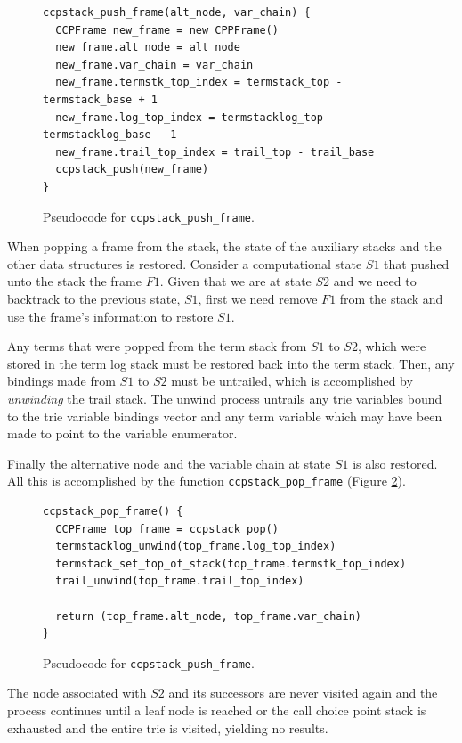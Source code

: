 \begin{figure}[ht]
\begin{Verbatim}[fontsize=\small]
ccpstack_push_frame(alt_node, var_chain) {
  CCPFrame new_frame = new CPPFrame()
  new_frame.alt_node = alt_node
  new_frame.var_chain = var_chain
  new_frame.termstk_top_index = termstack_top - termstack_base + 1
  new_frame.log_top_index = termstacklog_top - termstacklog_base - 1
  new_frame.trail_top_index = trail_top - trail_base
  ccpstack_push(new_frame)
}
\end{Verbatim}
\caption{Pseudo\-code for \texttt{ccpstack\_push\_frame}.}
\label{fig:ccpstack_push_frame}
\end{figure}

When popping a frame from the stack, the state of the auxiliary stacks and the other data
structures is restored. Consider a computational state $S1$ that pushed unto the stack
the frame $F1$. Given that we are at state $S2$ and we need to backtrack to the previous state, $S1$,
first we need remove $F1$ from the stack and use the frame's information to restore $S1$.

Any terms that were popped from the term stack from $S1$ to $S2$, which were
stored in the term log stack must be restored back into the term stack.
Then, any bindings made from $S1$ to $S2$ must be untrailed, which is
accomplished by \textit{unwinding} the trail stack. The unwind process untrails
any trie variables bound to the trie variable bindings vector
and any term variable which may have been made to point to the variable enumerator. 

Finally the alternative node and
the variable chain at state $S1$ is also restored. All this is accomplished by the
function \texttt{ccpstack\_pop\_frame} (Figure \ref{fig:ccpstack_pop_frame}).

\begin{figure}[ht]
\begin{Verbatim}[fontsize=\small]
ccpstack_pop_frame() {
  CCPFrame top_frame = ccpstack_pop()
  termstacklog_unwind(top_frame.log_top_index)
  termstack_set_top_of_stack(top_frame.termstk_top_index)
  trail_unwind(top_frame.trail_top_index)
  
  return (top_frame.alt_node, top_frame.var_chain)
}
\end{Verbatim}
\caption{Pseudo\-code for \texttt{ccpstack\_push\_frame}.}
\label{fig:ccpstack_pop_frame}
\end{figure}

The node associated with $S2$ and its successors are never visited again and
the process continues until a leaf node is reached or the call choice point stack
is exhausted and the entire trie is visited, yielding no results.

